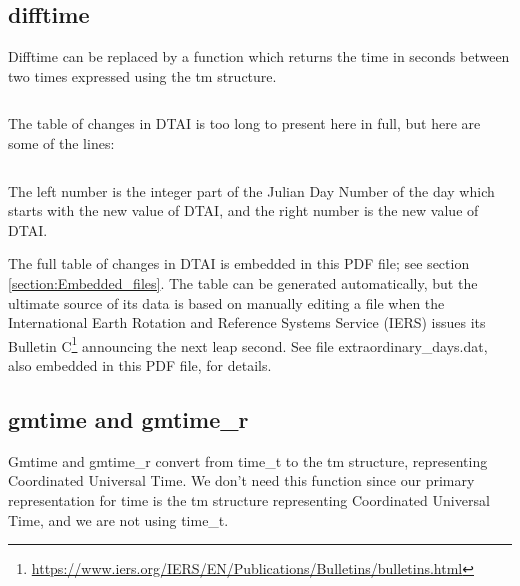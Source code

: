 \documentclass[letterpaper,twoside]{article}
\newcommand{\filename}{\ttfamily\smaller}
\begin{document}
\subsection{difftime}
\label{subsection:difftime}
Difftime can be replaced by a function which returns the time in seconds
between two times expressed using the {\ttfamily tm} structure.
\inputminted[firstline=37]{c}{src/time_diff.c}
The table of changes in DTAI is too long to present here in full,
but here are some of the lines:
\inputminted[firstline=46156,lastline=46184]{c}{dtai_table.tab}
The left number is the integer part of the Julian Day Number of the day
which starts with the new value of DTAI, and the right number is the new
value of DTAI.

The full table of changes in DTAI is embedded in this PDF file;
see section \ref{section:Embedded_files}.
The table can be generated automatically\citep{JBS_001}, but the ultimate
source of its data is based on manually editing a file when the
International Earth Rotation and Reference Systems Service (IERS)
issues its Bulletin
C\footnote{\href{https://www.iers.org/IERS/EN/Publications/Bulletins/bulletins.html}{https://www.iers.org/IERS/EN/Publications/Bulletins/bulletins.html}}
announcing the next leap second.  See file
{\filename extraordinary\_days.dat}, also embedded in this PDF file,
for details.

\subsection{gmtime and gmtime\_r}
Gmtime and gmtime\_r convert from {\ttfamily time\_t} to
the {\ttfamily tm} structure,
representing Coordinated Universal Time.  We don't
need this function since our primary representation for time is the
{\ttfamily tm} structure representing Coordinated Universal Time,
and we are not using {\ttfamily time\_t}.
\end{document}
